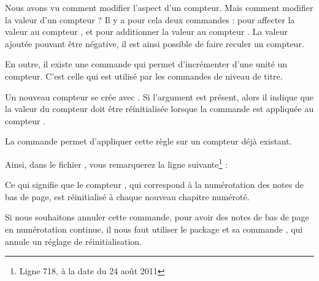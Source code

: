 Nous avons vu comment modifier l'aspect d'un compteur. Mais comment modifier la valeur d'un compteur ? Il y a pour cela deux commandes :  pour affecter la valeur  au compteur , et  pour additionner la valeur  au compteur . La valeur ajoutée pouvant être négative, il est ainsi possible de faire reculer un compteur.

En outre, il existe une commande  qui permet d'incrémenter d'une unité un compteur. C'est celle qui est utilisé par les commandes de niveau de titre.



Un nouveau compteur se crée  avec
 .
Si l'argument  est présent, alors il indique que la valeur du compteur  doit être réinitialisée lorsque la commande  est appliquée au compteur .

La commande    permet d'appliquer cette règle sur un compteur déjà existant.

Ainsi, dans le fichier , vous remarquerez la ligne suivante\footnote{Ligne 718, à la date du 24 août 2011}  :

\begin{latexcode}
\end{latexcode}

Ce qui signifie que le compteur  , qui correspond à la numérotation des notes de bas de page, est réinitialisé à chaque nouveau chapitre numéroté.

Si nous souhaitons annuler cette commande, pour avoir des notes de bas de page en numérotation continue, il nous faut utiliser le package  et sa commande , qui annule un réglage de réinitialisation.

\begin{latexcode}
\usepackage{remreset}
\makeatletter
{}
\makeatother
\end{latexcode}
